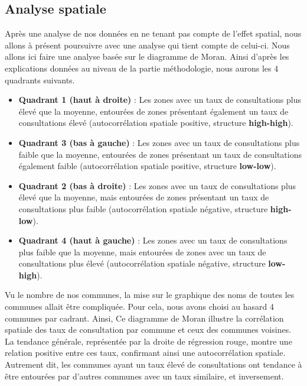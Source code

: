 \documentclass[
]{article}
\providecommand{\tightlist}{%
  \setlength{\itemsep}{0pt}\setlength{\parskip}{0pt}}
\begin{document}
\hypertarget{analyse-spatiale}{%
\subsection{Analyse spatiale}\label{analyse-spatiale}}

Après une analyse de nos données en ne tenant pas compte de l'effet
spatial, nous allons à présent poursuivre avec une analyse qui tient
compte de celui-ci. Nous allons ici faire une analyse basée sur le
diagramme de Moran. Ainsi d'après les explications données au niveau de
la partie méthodologie, nous aurons les 4 quadrants suivants.

\begin{itemize}
\tightlist
\item
  \textbf{Quadrant 1 (haut à droite)} : Les zones avec un taux de
  consultations plus élevé que la moyenne, entourées de zones présentant
  également un taux de consultations élevé (autocorrélation spatiale
  positive, structure \textbf{high-high}).
\item
  \textbf{Quadrant 3 (bas à gauche)} : Les zones avec un taux de
  consultations plus faible que la moyenne, entourées de zones
  présentant un taux de consultations également faible (autocorrélation
  spatiale positive, structure \textbf{low-low}).
\item
  \textbf{Quadrant 2 (bas à droite)} : Les zones avec un taux de
  consultations plus élevé que la moyenne, mais entourées de zones
  présentant un taux de consultations plus faible (autocorrélation
  spatiale négative, structure \textbf{high-low}).
\item
  \textbf{Quadrant 4 (haut à gauche)} : Les zones avec un taux de
  consultations plus faible que la moyenne, mais entourées de zones avec
  un taux de consultations plus élevé (autocorrélation spatiale
  négative, structure \textbf{low-high}).
\end{itemize}

Vu le nombre de nos communes, la mise sur le graphique des noms de
toutes les communes allait être compliquée. Pour cela, nous avons choisi
au hasard 4 communes par cadrant. Ainsi, Ce diagramme de Moran illustre
la corrélation spatiale des taux de consultation par commune et ceux des
communes voisines. La tendance générale, représentée par la droite de
régression rouge, montre une relation positive entre ces taux,
confirmant ainsi une autocorrélation spatiale. Autrement dit, les
communes ayant un taux élevé de consultations ont tendance à être
entourées par d'autres communes avec un taux similaire, et inversement.
\end{document}
